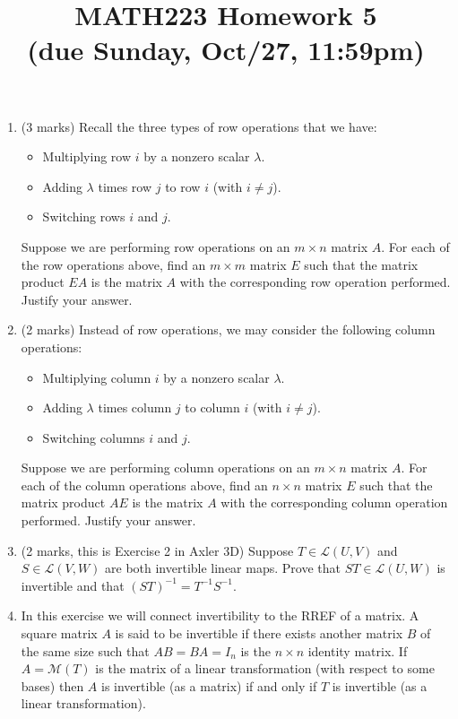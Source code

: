 \documentclass[12pt]{article}
\begin{document}
\title{MATH223 Homework 5\\ (due Sunday, Oct/27, 11:59pm)}
\author{}
\date{}
\maketitle
{}

\begin{enumerate}
\item (3 marks) Recall the three types of row operations that we have:
  \begin{itemize}
  \item Multiplying row $i$ by a nonzero scalar $\lambda$.
  \item Adding $\lambda$ times row $j$ to row $i$ (with $i\neq j$).
  \item Switching rows $i$ and $j$.
  \end{itemize}
  Suppose we are performing row operations on an $m\times n$ matrix $A$. For each of the row operations above, find an $m\times m$ matrix $E$ such that the matrix product $EA$ is the matrix $A$ with the corresponding row operation performed. Justify your answer.
\item (2 marks) Instead of row operations, we may consider the following column operations:
  \begin{itemize}
  \item Multiplying column $i$ by a nonzero scalar $\lambda$.
  \item Adding $\lambda$ times column $j$ to column $i$ (with $i\neq j$).
  \item Switching columns $i$ and $j$.
  \end{itemize}
  Suppose we are performing column operations on an $m\times n$ matrix $A$. For each of the column operations above, find an $n\times n$ matrix $E$ such that the matrix product $AE$ is the matrix $A$ with the corresponding column operation performed. Justify your answer.
\item (2 marks, this is Exercise 2 in Axler 3D) Suppose $T\in\mathcal{L}(U,V)$ and $S\in\mathcal{L}(V,W)$ are both invertible linear maps. Prove that $ST\in \mathcal{L}(U,W)$ is invertible and that $(ST)^{-1}=T^{-1}S^{-1}$.
\item In this exercise we will connect invertibility to the RREF of a matrix. A square matrix $A$ is said to be invertible if there exists another matrix $B$ of the same size such that $AB=BA=I_n$ is the $n\times n$ identity matrix. If $A=\mathcal{M}(T)$ is the matrix of a linear transformation (with respect to some bases) then $A$ is invertible (as a matrix) if and only if $T$ is invertible (as a linear transformation).

\end{enumerate}
\end{document}
